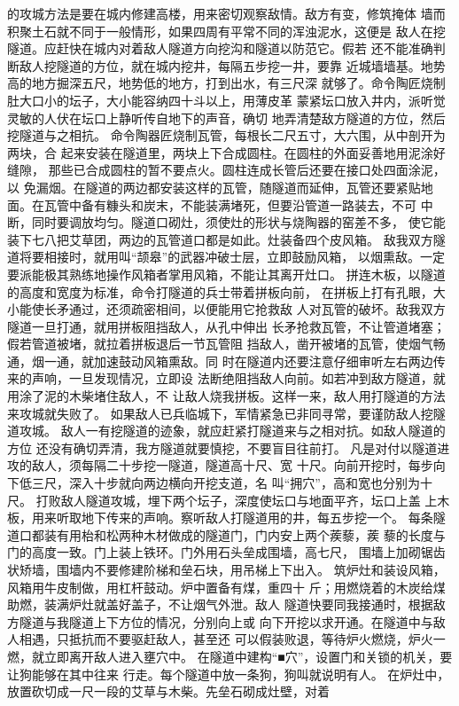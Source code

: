 \documentclass[12pt,UTF8]{ctexbook}
\begin{document}
的攻城方法是要在城内修建高楼，用来密切观察敌情。敌方有变，修筑掩体 
墙而积聚土石就不同于一般情形，如果四周有平常不同的浑浊泥水，这便是 
敌人在挖隧道。应赶快在城内对着敌人隧道方向挖沟和隧道以防范它。假若 
还不能准确判断敌人挖隧道的方位，就在城内挖井，每隔五步挖一井，要靠 
近城墙墙基。地势高的地方掘深五尺，地势低的地方，打到出水，有三尺深 
就够了。命令陶匠烧制肚大口小的坛子，大小能容纳四十斗以上，用薄皮革 
蒙紧坛口放入井内，派听觉灵敏的人伏在坛口上静听传自地下的声音，确切 
地弄清楚敌方隧道的方位，然后挖隧道与之相抗。 
命令陶器匠烧制瓦管，每根长二尺五寸，大六围，从中剖开为两块，合 
起来安装在隧道里，两块上下合成圆柱。在圆柱的外面妥善地用泥涂好缝隙， 
那些已合成圆柱的暂不要点火。圆柱连成长管后还要在接口处四面涂泥，以 
免漏烟。在隧道的两边都安装这样的瓦管，随隧道而延伸，瓦管还要紧贴地 
面。在瓦管中备有糠头和炭末，不能装满堵死，但要沿管道一路装去，不可 
中断，同时要调放均匀。隧道口砌灶，须使灶的形状与烧陶器的窑差不多， 
使它能装下七八把艾草团，两边的瓦管道口都是如此。灶装备四个皮风箱。 
敌我双方隧道将要相接时，就用叫“颉皋”的武器冲破士层，立即鼓励风箱， 
以烟熏敌。一定要派能极其熟练地操作风箱者掌用风箱，不能让其离开灶口。 
拼连木板，以隧道的高度和宽度为标准，命令打隧道的兵士带着拼板向前， 
在拼板上打有孔眼，大小能使长矛通过，还须疏密相间，以便能用它抢救敌 
人对瓦管的破坏。敌我双方隧道一旦打通，就用拼板阻挡敌人，从孔中伸出 
长矛抢救瓦管，不让管道堵塞；假若管道被堵，就拉着拼板退后一节瓦管阻 
挡敌人，凿开被堵的瓦管，使烟气畅通，烟一通，就加速鼓动风箱熏敌。同 
时在隧道内还要注意仔细审听左右两边传来的声响，一旦发现情况，立即设 
法断绝阻挡敌人向前。如若冲到敌方隧道，就用涂了泥的木柴堵住敌人，不 
让敌人烧我拼板。这样一来，敌人用打隧道的方法来攻城就失败了。 
如果敌人已兵临城下，军情紧急已非同寻常，要谨防敌人挖隧道攻城。 
敌人一有挖隧道的迹象，就应赶紧打隧道来与之相对抗。如敌人隧道的方位 
还没有确切弄清，我方隧道就要慎挖，不要盲目往前打。 
凡是对付以隧道进攻的敌人，须每隔二十步挖一隧道，隧道高十尺、宽 
十尺。向前开挖时，每步向下低三尺，深入十步就向两边横向开挖支道，名 
叫“拥穴”，高和宽也分别为十尺。 
打败敌人隧道攻城，埋下两个坛子，深度使坛口与地面平齐，坛口上盖 
上木板，用来听取地下传来的声响。察听敌人打隧道用的井，每五步挖一个。 
每条隧道口都装有用枱和松两种木材做成的隧道门，门内安上两个蒺藜，蒺 
藜的长度与门的高度一致。门上装上铁环。门外用石头垒成围墙，高七尺， 
围墙上加砌锯齿状矫墙，围墙内不要修建阶梯和垒石块，用吊梯上下出入。 
筑炉灶和装设风箱，风箱用牛皮制做，用杠杆鼓动。炉中置备有煤，重四十 
斤；用燃烧着的木炭给煤助燃，装满炉灶就盖好盖子，不让烟气外泄。敌人 
隧道快要同我接通时，根据敌方隧道与我隧道上下方位的情况，分别向上或 
向下开挖以求开通。在隧道中与敌人相遇，只抵抗而不要驱赶敌人，甚至还 
可以假装败退，等待炉火燃烧，炉火一燃，就立即离开敌人进入壅穴中。 
在隧道中建构“■穴”，设置门和关锁的机关，要让狗能够在其中往来 
行走。每个隧道中放一条狗，狗叫就说明有人。 
在炉灶中，放置砍切成一尺一段的艾草与木柴。先垒石砌成灶壁，对着 
\end{document}
